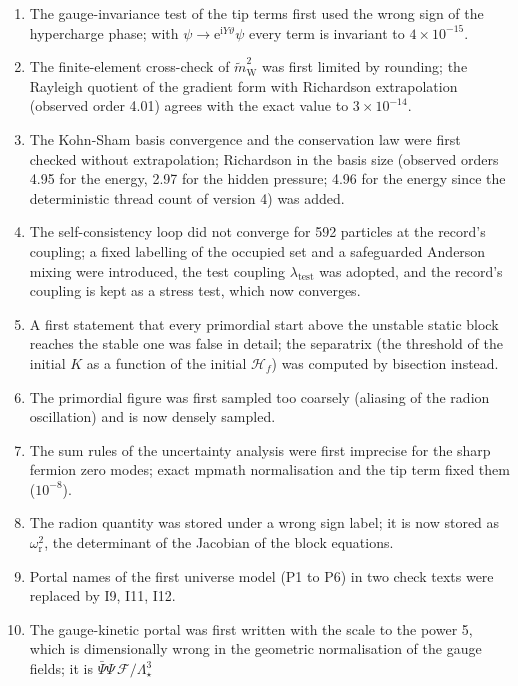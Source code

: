 \documentclass[
  10pt,
]{article}
\providecommand{\tightlist}{%
  \setlength{\itemsep}{0pt}\setlength{\parskip}{0pt}}
\begin{document}
\begin{enumerate}
\def\labelenumi{\arabic{enumi}.}
\tightlist
\item
  The gauge-invariance test of the tip terms first used the wrong sign
  of the hypercharge phase; with
  \(\psi \to \mathrm{e}^{\mathrm{i}Y\vartheta}\psi\) every term is
  invariant to \(4\times10^{-15}\).
\item
  The finite-element cross-check of \(\tilde m_{\mathrm{W}}^2\) was
  first limited by rounding; the Rayleigh quotient of the gradient form
  with Richardson extrapolation (observed order 4.01) agrees with the
  exact value to \(3\times10^{-14}\).
\item
  The Kohn-Sham basis convergence and the conservation law were first
  checked without extrapolation; Richardson in the basis size (observed
  orders 4.95 for the energy, 2.97 for the hidden pressure; 4.96 for the
  energy since the deterministic thread count of version 4) was added.
\item
  The self-consistency loop did not converge for 592 particles at the
  record's coupling; a fixed labelling of the occupied set and a
  safeguarded Anderson mixing were introduced, the test coupling
  \(\lambda_{\mathrm{test}}\) was adopted, and the record's coupling is
  kept as a stress test, which now converges.
\item
  A first statement that every primordial start above the unstable
  static block reaches the stable one was false in detail; the
  separatrix (the threshold of the initial \(K\) as a function of the
  initial \(\mathcal{H}_f\)) was computed by bisection instead.
\item
  The primordial figure was first sampled too coarsely (aliasing of the
  radion oscillation) and is now densely sampled.
\item
  The sum rules of the uncertainty analysis were first imprecise for the
  sharp fermion zero modes; exact mpmath normalisation and the tip term
  fixed them (\(10^{-8}\)).
\item
  The radion quantity was stored under a wrong sign label; it is now
  stored as \(\omega_{\mathrm{r}}^2\), the determinant of the Jacobian
  of the block equations.
\item
  Portal names of the first universe model (P1 to P6) in two check texts
  were replaced by I9, I11, I12.
\item
  The gauge-kinetic portal was first written with the scale to the power
  5, which is dimensionally wrong in the geometric normalisation of the
  gauge fields; it is \(\bar\Psi\Psi\,\mathcal{F}/\Lambda_\star^3\)

\end{enumerate}
\end{document}
